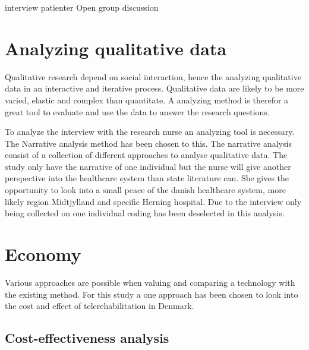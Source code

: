 interview patienter
Open group discussion 

\section{Analyzing qualitative data}


Qualitative research depend on social interaction, hence the analyzing qualitative data in an interactive and iterative process. Qualitative data are likely to be more varied, elastic and complex than quantitate. A analyzing method is therefor a great tool to evaluate and use the data to answer the research questions. 

To analyze the interview with the research nurse an analyzing tool is necessary. The Narrative analysis method has been chosen to this. The narrative analysis consist of a collection of different approaches to analyse qualitative data. 
 The study only have the narrative of one individual but the nurse will give another perspective into the healthcare system than state literature can. She gives the opportunity to look into a small peace of the danish healthcare system, more likely region Midtjylland and specific Herning hospital. Due to the interview only being collected on one individual coding has been deselected in this analysis.  


\section{Economy}


Various approaches are possible when valuing and comparing a technology with the existing method. For this study a one approach has been chosen to look into the cost and effect of telerehabilitation in Denmark.

\subsection{Cost-effectiveness analysis}



